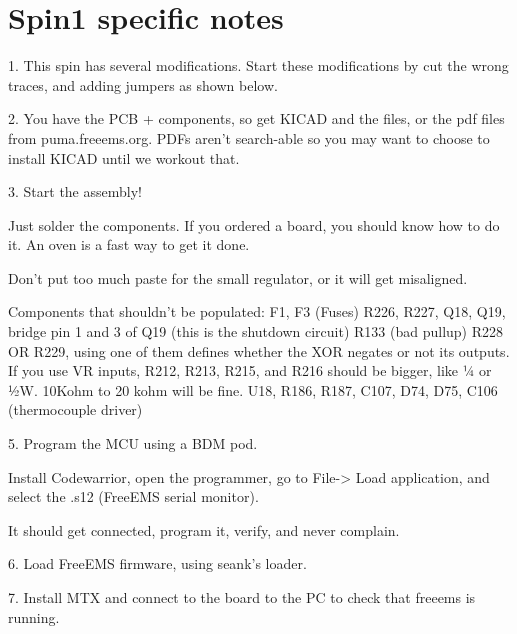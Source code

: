 \section{Spin1 specific notes}

1. This spin has several modifications. Start these modifications by cut the wrong traces, and adding jumpers as shown below.

2. You have the PCB + components, so get KICAD and the files, or the pdf files from puma.freeems.org. PDFs aren't search-able so you may want to choose to install KICAD until we workout that.

3. Start the assembly!

Just solder the components. If you ordered a board, you should know how to do it. An oven is a fast way to get it done.

Don't put too much paste for the small regulator, or it will get misaligned.

Components that shouldn't be populated:
F1, F3 (Fuses)
R226, R227, Q18, Q19, bridge pin 1 and 3 of Q19 (this is the shutdown circuit)
R133 (bad pullup)
R228 OR R229, using one of them defines whether the XOR negates or not its outputs.
If you use VR inputs, R212, R213, R215, and R216 should be bigger, like ¼ or ½W. 10Kohm to 20 kohm will be fine.
U18, R186, R187, C107, D74, D75, C106 (thermocouple driver)

5. Program the MCU using a BDM pod.

Install Codewarrior, open the programmer, go to File-> Load application, and select the .s12 (FreeEMS serial monitor).

It should get connected, program it, verify, and never complain.

6. Load FreeEMS firmware, using seank's loader.

7. Install  MTX and connect to the board to the PC to check that freeems is running.